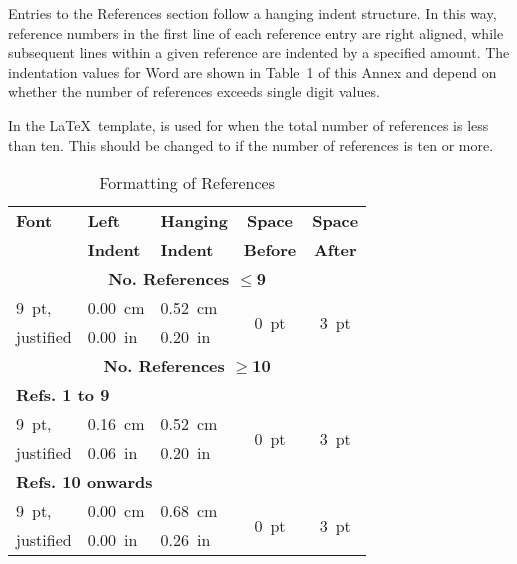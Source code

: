 \documentclass[letterpaper,  %
              ]{jacow-2_3}   %
\begin{document}
{{Entries to the References section follow a hanging indent
structure. In this way, reference numbers in the first
line of each reference entry are right aligned, while subsequent
lines within a given reference are indented by a
specified amount. The indentation values for Word are
shown in Table~1 of this Annex and depend on whether
the number of references exceeds single digit values.

In the \LaTeX\ template, \verb|| is used for
when the total number of references is less than ten. This
should be changed to \verb|| if the number of
references is ten or more.

\begin{table}[h!t]
	\centering
	\caption{Formatting of References}
	\label{format-refs}
	\begin{tabular}{lllcc}
		\toprule
		\textbf{Font} & \textbf{Left}   & \textbf{Hanging}  & \textbf{Space}   & \textbf{Space} \\
		& \textbf{Indent} & \textbf{Indent}   & \textbf{Before}  & \textbf{After} \\
		\midrule
		\multicolumn{5}{c}{\textbf{No. References $\le$9}}  \\
		\SI{9}{pt},   & \SI{0.00}{cm}   & \SI{0.52}{cm}     & \multirow{2}{*}{\SI{0}{pt}} 
		& \multirow{2}{*}{\SI{3}{pt}}  \\
		justified     & \SI{0.00}{in}   & \SI{0.20}{in}     &                  &             \\
		\midrule
		\multicolumn{5}{c}{\textbf{No. References $\ge$10}}  \\[1mm]
		\multicolumn{5}{l}{\textbf{Refs. 1 to 9}}           \\[1mm]
		\SI{9}{pt},   & \SI{0.16}{cm}   & \SI{0.52}{cm}     &  \multirow{2}{*}{\SI{0}{pt}} 
		& \multirow{2}{*}{\SI{3}{pt}}  \\
		justified     & \SI{0.06}{in}   & \SI{0.20}{in}     &                  &             \\[3mm]		\multicolumn{5}{l}{\textbf{Refs. 10 onwards}}    \\[1mm]
		\SI{9}{pt},   & \SI{0.00}{cm}   & \SI{0.68}{cm}     &  \multirow{2}{*}{\SI{0}{pt}} 
		& \multirow{2}{*}{\SI{3}{pt}}  \\
		justified     & \SI{0.00}{in}   & \SI{0.26}{in}     &                  &             \\
		\bottomrule  
	\end{tabular}
\end{table}

}}
\end{document}
